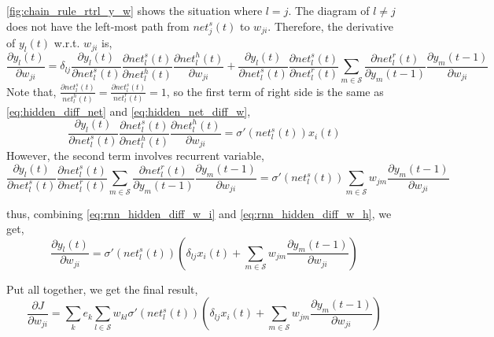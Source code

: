 \documentclass[12pt]{article}
\numberwithin{equation}{section}
\begin{document}
\autoref{fig:chain_rule_rtrl_y_w} shows the situation where $l = j$. The diagram of $l \neq j$ does not have the left-most path from $net^s_j(t)$ to $w_{ji}$.
Therefore, the derivative of $y_l(t)$ w.r.t. $w_{ji}$ is,
\begin{equation}
    \frac{\partial y_l(t)}{\partial w_{ji}} = \delta_{lj}\frac{\partial y_l(t)}{\partial net^s_l(t)} \frac{\partial net^s_l(t)}{\partial net^h_l(t)}\frac{\partial net^h_l(t)}{\partial w_{ji}} 
                                                           + \frac{\partial y_l(t)}{\partial net^s_l(t)} \frac{\partial net^s_l(t)}{\partial net^r_l(t)} 
                                                              \sum_{m \in \mathcal{S}} \frac{\partial net^r_l(t)}{\partial y_m(t-1)} \frac{\partial y_m(t-1)}{\partial w_{ji}}
\end{equation}
Note that, $\frac{\partial net^s_l(t)}{net^h_l(t)} = \frac{\partial net^s_l(t)}{net^r_l(t)} = 1$, 
so the first term of right side is the same as \eqref{eq:hidden_diff_net} and \eqref{eq:hidden_net_diff_w},
\begin{equation} \label{eq:rnn_hidden_diff_w_i}
    \frac{\partial y_l(t)}{\partial net^s_l(t)} \frac{\partial net^s_l(t)}{\partial net^h_l(t)}\frac{\partial net^h_l(t)}{\partial w_{ji}} = \sigma'(net^s_l(t))x_i(t)
\end{equation}
However, the second term involves recurrent variable,
\begin{equation} \label{eq:rnn_hidden_diff_w_h}
   \frac{\partial y_l(t)}{\partial net^s_l(t)} \frac{\partial net^s_l(t)}{\partial net^r_l(t)} 
    \sum_{m \in \mathcal{S}} \frac{\partial net^r_l(t)}{\partial y_m(t-1)} \frac{\partial y_m(t-1)}{\partial w_{ji}}  
             = \sigma'(net^s_l(t))\sum_{m \in \mathcal{S}} w_{jm} \frac{\partial y_m(t-1)}{\partial w_{ji}}
\end{equation}

thus, combining  \eqref{eq:rnn_hidden_diff_w_i} and \eqref{eq:rnn_hidden_diff_w_h}, we get,
\begin{equation}
    \frac{\partial y_l(t)}{\partial w_{ji}} = \sigma'(net^s_l(t))(\delta_{lj}x_i(t) + \sum_{m \in \mathcal{S}} w_{jm} \frac{\partial y_m(t-1)}{\partial w_{ji}})
\end{equation}

Put all together, we get the final result,
\begin{equation} \label{eq:rnn_wji}
    \frac{\partial J}{\partial w_{ji}} = \sum_k{e_k \sum_{l \in \mathcal{S}} { w_{kl} \sigma'(net^s_l(t))(\delta_{lj}x_i(t) + \sum_{m \in \mathcal{S}} w_{jm} \frac{\partial y_m(t-1)}{\partial w_{ji}})}}
\end{equation}
\end{document}
